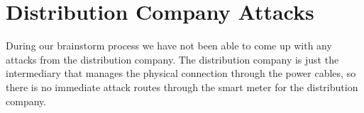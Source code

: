 
\section{Distribution Company Attacks}
During our brainstorm process we have not been able to come up with any attacks from the distribution company.
The distribution company is just the intermediary that manages the physical connection through the power cables, so there is no immediate attack routes through the smart meter for the distribution company.

